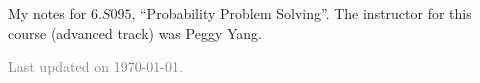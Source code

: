 \documentclass[11pt]{article}
\begin{document}
\maketitle


My notes for $6.S095$, ``Probability Problem Solving''. The instructor for this course (advanced track) was Peggy Yang. 

\vfill

\hfill \textcolor{gray}{\small Last updated on \today.}
\newpage
\tableofcontents 
\newpage
\importfiles %
\end{document}
